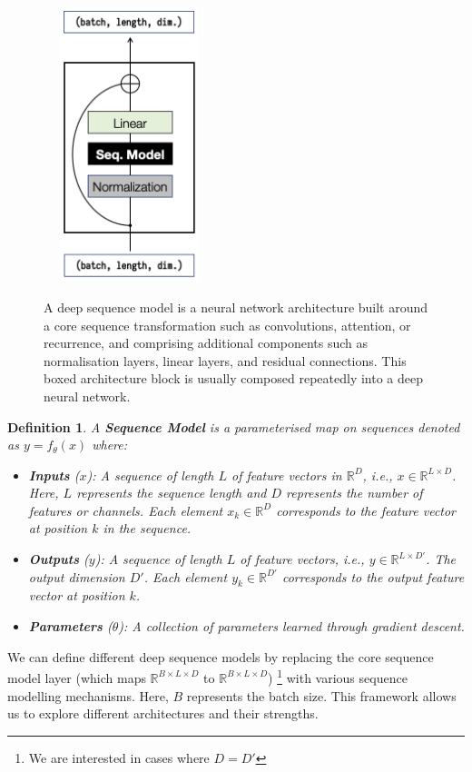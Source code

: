 \documentclass[12pt,a4paper]{report}
\newtheorem{definition}{Definition}
\begin{document}
\begin{figure}
    {\includegraphics[width=5cm, height=8cm]{C1.1_Deep_Sequence_Models_GenArch.png}}
    \caption{A deep sequence model is a neural network architecture built around a core sequence transformation such as convolutions, attention, or recurrence, and comprising additional components such as normalisation layers, linear layers, and residual connections. This boxed architecture block is usually composed repeatedly into a deep neural network.}
    \label{deep-sequence-arch}
\end{figure}

\begin{definition}
    A \textbf{Sequence Model} is a parameterised map on sequences denoted as $y = f_\theta(x)$ where:
    \begin{itemize}
        \item \textbf{Inputs} ($x$): A sequence of length $L$ of feature vectors in $\mathbb{R}^D$, i.e., $x \in \mathbb{R}^{L \times D}$. Here, $L$ represents the sequence length and $D$ represents the number of features or channels. Each element $x_k \in \mathbb{R}^D$ corresponds to the feature vector at position $k$ in the sequence.
        \item \textbf{Outputs} ($y$): A sequence of length $L$ of feature vectors, i.e., $y \in \mathbb{R}^{L \times D'}$. The output dimension $D'$. Each element $y_k \in \mathbb{R}^{D'}$ corresponds to the output feature vector at position $k$.
        \item \textbf{Parameters} ($\theta$): A collection of parameters learned through gradient descent.
    \end{itemize}
\end{definition}

We can define different deep sequence models by replacing the core sequence model layer (which maps $\mathbb{R}^{B \times L \times D}$ to $\mathbb{R}^{B \times L \times D}$) \footnote{We are interested in cases where $D = D'$} with various sequence modelling mechanisms. Here, $B$ represents the batch size. This framework allows us to explore different architectures and their strengths.
\end{document}
